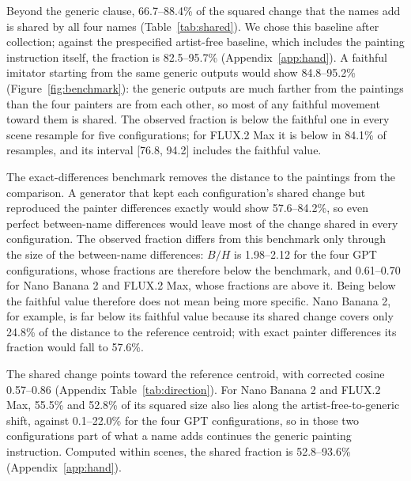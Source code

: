 \documentclass[10pt]{article}
\begin{document}


Beyond the generic clause, 66.7--88.4\% of the squared change that the names add is shared by all
four names (Table~\ref{tab:shared}). We chose this baseline after collection; against the
prespecified artist-free baseline, which includes the painting instruction itself, the fraction is
82.5--95.7\% (Appendix~\ref{app:hand}). A faithful imitator starting from the same generic outputs
would show 84.8--95.2\% (Figure~\ref{fig:benchmark}): the generic outputs are much farther from the
paintings than the four painters are from each other, so most of any faithful movement toward them
is shared. The observed fraction is below the faithful one in every scene resample for five
configurations; for FLUX.2 Max it is below in 84.1\% of resamples, and its interval [76.8, 94.2]
includes the faithful value.

The exact-differences benchmark removes the distance to the paintings from the comparison. A
generator that kept each configuration's shared change but reproduced the painter differences
exactly would show 57.6--84.2\%, so even perfect between-name differences would leave most of the
change shared in every configuration. The observed fraction differs from this benchmark only
through the size of the between-name differences: $B/H$ is 1.98--2.12 for the four GPT
configurations, whose fractions are therefore below the benchmark, and 0.61--0.70 for Nano Banana 2
and FLUX.2 Max, whose fractions are above it. Being below the faithful value therefore does not
mean being more specific. Nano Banana 2, for example, is far below its faithful value because its
shared change covers only 24.8\% of the distance to the reference centroid; with exact painter
differences its fraction would fall to 57.6\%.

The shared change points toward the reference centroid, with corrected cosine 0.57--0.86 (Appendix
Table~\ref{tab:direction}). For Nano Banana 2 and FLUX.2 Max, 55.5\% and 52.8\% of its squared size
also lies along the artist-free-to-generic shift, against 0.1--22.0\% for the four GPT
configurations, so in those two configurations part of what a name adds continues the generic
painting instruction. Computed within scenes, the shared fraction is 52.8--93.6\%
(Appendix~\ref{app:hand}).
\end{document}
